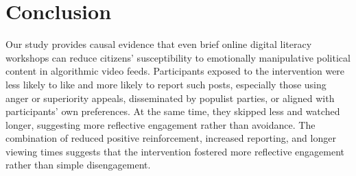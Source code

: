 \documentclass[12pt]{article}
\begin{document}








\section*{Conclusion}
Our study provides causal evidence that even brief online digital literacy workshops can reduce citizens’ susceptibility to emotionally manipulative political content in algorithmic video feeds. Participants exposed to the intervention were less likely to like and more likely to report such posts, especially those using anger or superiority appeals, disseminated by populist parties, or aligned with participants’ own preferences. At the same time, they skipped less and watched longer, suggesting more reflective engagement rather than avoidance. 
The combination of reduced positive reinforcement, increased reporting, and longer viewing times suggests that the intervention fostered more reflective engagement rather than simple disengagement.
\end{document}
